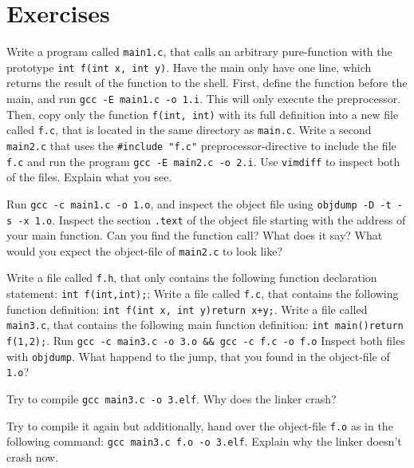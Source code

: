 \documentclass{dcbl/challenge}
\begin{document}
\section*{Exercises}
\begin{aufgabe}
    Write a program called \texttt{main1.c}, that calls an arbitrary pure-function with the prototype \texttt{int f(int x, int y)}.
    Have the main only have one line, which returns the result of the function to the shell.
    First, define the function before the main, and run \texttt{gcc -E main1.c -o 1.i}.
    This will only execute the preprocessor.
    Then, copy only the function \texttt{f(int, int)} with its full definition into a new file called \texttt{f.c}, that is located in the same directory as \texttt{main.c}.
    Write a second \texttt{main2.c} that uses the \texttt{\#include "f.c"} preprocessor-directive to include the file \texttt{f.c} and run the program \texttt{gcc -E main2.c -o 2.i}.
    Use \texttt{vimdiff} to inspect both of the files.
    Explain what you see.
\end{aufgabe}

\begin{aufgabe}
    Run \texttt{gcc -c main1.c -o 1.o}, and inspect the object file using \texttt{objdump -D -t -s -x 1.o}.
    Inspect the section \texttt{.text} of the object file starting with the address of your main function.
    Can you find the function call? 
    What does it say?
    What would you expect the object-file of \texttt{main2.c} to look like?
\end{aufgabe}
    
\begin{aufgabe}
    Write a file called \texttt{f.h}, that only contains the following function declaration statement: \texttt{int f(int,int);};
    Write a file called \texttt{f.c}, that contains the following function definition: \texttt{int f(int x, int y){return x+y;}}.
    Write a file called \texttt{main3.c}, that contains the following main function definition: \texttt{int main(){return f(1,2);}}.
    Run \texttt{gcc -c main3.c -o 3.o \&\& gcc -c f.c -o f.o}
    Inspect both files with \texttt{objdump}.
    What happend to the jump, that you found in the object-file of \texttt{1.o}?
\end{aufgabe}

\begin{aufgabe}
    Try to compile \texttt{gcc main3.c -o 3.elf}. Why does the linker crash?
\end{aufgabe}

\begin{aufgabe}
    Try to compile it again but additionally, hand over the object-file \texttt{f.o} as in the following command: \texttt{gcc main3.c f.o -o 3.elf}.
    Explain why the linker doesn't crash now.
\end{aufgabe}
\end{document}
